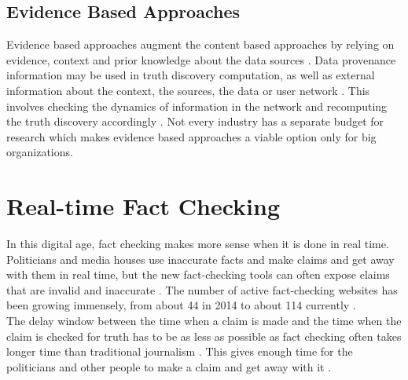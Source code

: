 \documentclass[sigconf]{acmart}
\begin{document}
\subsection{Evidence Based Approaches}
Evidence based approaches augment the content based approaches by relying on evidence, context and prior knowledge about the data sources \cite{Berti-Equille2016}. Data provenance information may be used in truth discovery computation, as well as external information about the context, the sources, the data or user network \cite{Berti-Equille2016}. This involves checking the dynamics of information in the network and recomputing the truth discovery accordingly \cite{Berti-Equille2016}. Not every industry has a separate budget for research which makes evidence based approaches a viable option only for big organizations.

\section{Real-time Fact Checking}
In this digital age, fact checking makes more sense when it is done in real time. Politicians and media houses use inaccurate facts and make claims and get away with them in real time, but the new fact-checking tools can often expose claims that are invalid and inaccurate \cite{Hassan2015}.  The number of active fact-checking websites has been growing immensely, from about 44 in 2014 to about 114 currently \cite{Hassan2015}. \\
The delay window between the time when a claim is made and the time when the claim is checked for truth has to be as less as possible as fact checking often takes longer time than traditional journalism \cite{Hassan2015}. This gives enough time for the politicians and other people to make a claim and get away with it \cite{Hassan2015}.
\end{document}
